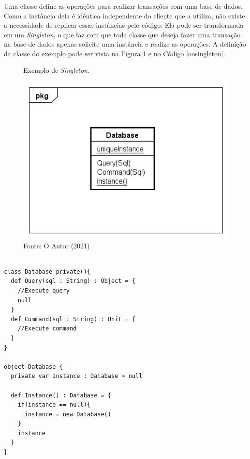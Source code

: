Uma classe define as operações para realizar transações com 
uma base de dados. Como a instância dela é idêntica independente 
do cliente que a utiliza, não existe a necessidade de replicar 
essas instâncias pelo código. Ela pode ser transformada em 
um \textit{Singleton}, o que faz com que toda classe que deseja fazer 
uma transação na base de dados apenas solicite uma instância 
e realize as operações. A definição da classe do exemplo 
pode ser vista na Figura \ref{singleton_exemplo} e no 
Código \ref{oosingleton}.

\begin{figure}[htb]
	\caption{\label{singleton_exemplo}Exemplo de \textit{Singleton}.}
	\begin{center}
	    \includegraphics[scale=0.6]{5_padroes-contexto-funcional/5.1_criacionais/5.1.5_singleton/singleton_exemplo.png}
	\end{center}
  \caption*{Fonte: O Autor (2021)}
\end{figure}

\begin{lstlisting}[caption={\textit{Singleton} Orientação a Objetos.},label=oosingleton]

class Database private(){
  def Query(sql : String) : Object = {
    //Execute query
    null
  }
  def Command(sql : String) : Unit = {
    //Execute command
  }
}

object Database {
  private var instance : Database = null

  def Instance() : Database = {
    if(instance == null){
      instance = new Database()
    }
    instance
  }
}

\end{lstlisting}

